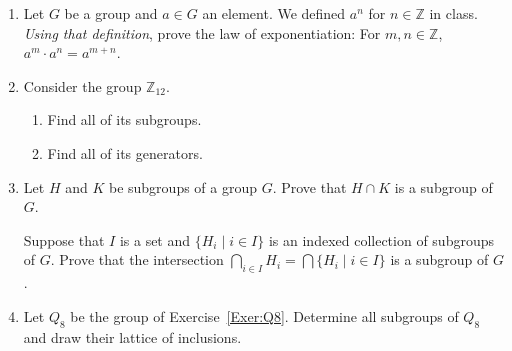 \documentclass[12pt]{article}
\newcommand{\ZZ}{{\mathbb Z}}
\begin{document}
\begin{enumerate}
  Formulate and deduce the general formula for ${^\sigma}w$ when $\sigma,w\in S_n$.


\item
  Let $G$ be a group and $a\in G$ an element.
  We defined $a^n$ for $n\in\ZZ$ in class.
  {\it Using that definition}, prove the law of exponentiation:  For $m,n\in\ZZ$, $a^m\cdot a^n=a^{m+n}$.
  
\item  Consider the group $\ZZ_{12}$.
  \begin{enumerate}
  \item  Find all of its subgroups.
  \item Find all of its generators.
  \end{enumerate}


\item  Let $H$ and $K$ be subgroups of a group $G$.  Prove that $H\cap K$ is a subgroup of $G$.

  Suppose that $I$ is a set and $\{H_i \mid i\in I\}$ is an indexed collection of subgroups of $G$.\newline
  Prove that the intersection $\bigcap_{i\in I} H_i = \bigcap \{H_i \mid i\in I\}$ is a subgroup of $G$.


\item
     Let $Q_8$ be the group of Exercise~\ref{Exer:Q8}.
    Determine all subgroups of $Q_8$ and draw their lattice of inclusions.



\end{enumerate}
\end{document}

